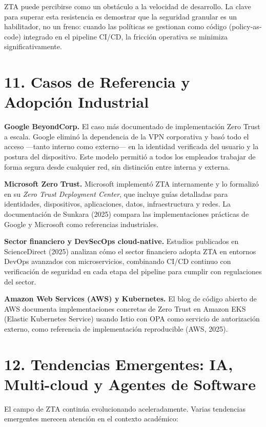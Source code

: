 \documentclass[12pt,a4paper]{article}
\begin{document}
ZTA puede percibirse como un obstáculo a la velocidad de desarrollo. La clave para superar esta resistencia es demostrar que la seguridad granular es un habilitador, no un freno: cuando las políticas se gestionan como código (policy-as-code) integrado en el pipeline CI/CD, la fricción operativa se minimiza significativamente.



\section{11. Casos de Referencia y Adopción Industrial}

\textbf{Google BeyondCorp.} El caso más documentado de implementación Zero Trust a escala. Google eliminó la dependencia de la VPN corporativa y basó todo el acceso —tanto interno como externo— en la identidad verificada del usuario y la postura del dispositivo. Este modelo permitió a todos los empleados trabajar de forma segura desde cualquier red, sin distinción entre interna y externa.

\textbf{Microsoft Zero Trust.} Microsoft implementó ZTA internamente y lo formalizó en su \textit{Zero Trust Deployment Center}, que incluye guías detalladas para identidades, dispositivos, aplicaciones, datos, infraestructura y redes. La documentación de Sunkara (2025) compara las implementaciones prácticas de Google y Microsoft como referencias industriales.

\textbf{Sector financiero y DevSecOps cloud-native.} Estudios publicados en ScienceDirect (2025) analizan cómo el sector financiero adopta ZTA en entornos DevOps avanzados con microservicios, combinando CI/CD continuo con verificación de seguridad en cada etapa del pipeline para cumplir con regulaciones del sector.

\textbf{Amazon Web Services (AWS) y Kubernetes.} El blog de código abierto de AWS documenta implementaciones concretas de Zero Trust en Amazon EKS (Elastic Kubernetes Service) usando Istio con OPA como servicio de autorización externo, como referencia de implementación reproducible (AWS, 2025).



\section{12. Tendencias Emergentes: IA, Multi-cloud y Agentes de Software}

El campo de ZTA continúa evolucionando aceleradamente. Varias tendencias emergentes merecen atención en el contexto académico:
\end{document}

